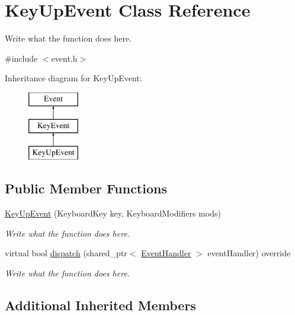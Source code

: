 \hypertarget{classKeyUpEvent}{\section{Key\+Up\+Event Class Reference}
\label{classKeyUpEvent}
}


Write what the function does here.  




{\ttfamily \#include $<$event.\+h$>$}

Inheritance diagram for Key\+Up\+Event\+:\begin{figure}[H]
\begin{center}
\leavevmode
\includegraphics[height=3.000000cm]{classKeyUpEvent}
\end{center}
\end{figure}
\subsection*{Public Member Functions}
\begin{DoxyCompactItemize}
\item 
\hyperlink{classKeyUpEvent_a26f3177d7dc9887e87fbea4f5dded283}{Key\+Up\+Event} (Keyboard\+Key key, Keyboard\+Modifiers mods)
\begin{DoxyCompactList}\small\item\em Write what the function does here. \end{DoxyCompactList}\item 
virtual bool \hyperlink{classKeyUpEvent_a24d061fc9e6559908c91972376d4a3d4}{dispatch} (shared\+\_\+ptr$<$ \hyperlink{structEventHandler}{Event\+Handler} $>$ event\+Handler) override
\begin{DoxyCompactList}\small\item\em Write what the function does here. \end{DoxyCompactList}\end{DoxyCompactItemize}
\subsection*{Additional Inherited Members}


